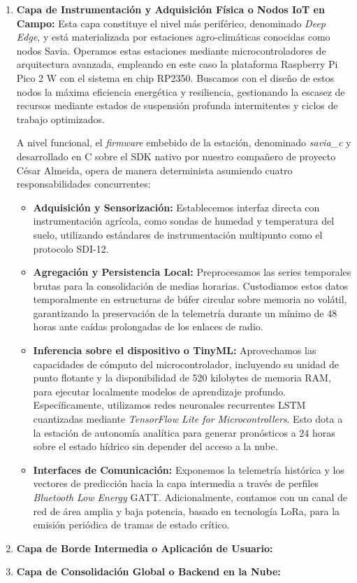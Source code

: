 \begin{enumerate}
    \item \textbf{Capa de Instrumentación y Adquisición Física o Nodos IoT en Campo:} Esta capa constituye el nivel más periférico, denominado \textit{Deep Edge}, y está materializada por estaciones agro-climáticas conocidas como nodos Savia. Operamos estas estaciones mediante microcontroladores de arquitectura avanzada, empleando en este caso la plataforma Raspberry Pi Pico 2 W con el sistema en chip RP2350. Buscamos con el diseño de estos nodos la máxima eficiencia energética y resiliencia, gestionando la escasez de recursos mediante estados de suspensión profunda intermitentes y ciclos de trabajo optimizados.
    
    A nivel funcional, el \textit{firmware} embebido de la estación, denominado \textit{savia\_c} y desarrollado en C sobre el SDK nativo por nuestro compañero de proyecto César Almeida, opera de manera determinista asumiendo cuatro responsabilidades concurrentes:
    \begin{itemize}
        \item \textbf{Adquisición y Sensorización:} Establecemos interfaz directa con instrumentación agrícola, como sondas de humedad y temperatura del suelo, utilizando estándares de instrumentación multipunto como el protocolo SDI-12.
        \item \textbf{Agregación y Persistencia Local:} Preprocesamos las series temporales brutas para la consolidación de medias horarias. Custodiamos estos datos temporalmente en estructuras de búfer circular sobre memoria no volátil, garantizando la preservación de la telemetría durante un mínimo de 48 horas ante caídas prolongadas de los enlaces de radio.
        \item \textbf{Inferencia sobre el dispositivo o TinyML:} Aprovechamos las capacidades de cómputo del microcontrolador, incluyendo su unidad de punto flotante y la disponibilidad de 520 kilobytes de memoria RAM, para ejecutar localmente modelos de aprendizaje profundo. Específicamente, utilizamos redes neuronales recurrentes LSTM cuantizadas mediante \textit{TensorFlow Lite for Microcontrollers}. Esto dota a la estación de autonomía analítica para generar pronósticos a 24 horas sobre el estado hídrico sin depender del acceso a la nube.
        \item \textbf{Interfaces de Comunicación:} Exponemos la telemetría histórica y los vectores de predicción hacia la capa intermedia a través de perfiles \textit{Bluetooth Low Energy} GATT. Adicionalmente, contamos con un canal de red de área amplia y baja potencia, basado en tecnología LoRa, para la emisión periódica de tramas de estado crítico.
    \end{itemize}

    \item \textbf{Capa de Borde Intermedia o Aplicación de Usuario:} 
    
    \item \textbf{Capa de Consolidación Global o Backend en la Nube:} 
\end{enumerate}
